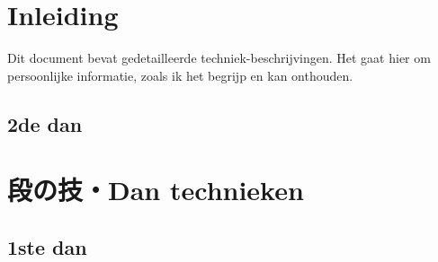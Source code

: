 \documentclass[a4paper, 12pt]{article}
\begin{document}

\begin{CJK*}{UTF8}{min}
\CJKtilde



\newpage
\setcounter{page}{1}
\tableofcontents

\newpage
\setcounter{page}{1}

\section{Inleiding}
\noindent Dit document bevat gedetailleerde techniek-beschrijvingen. Het gaat hier om persoonlijke informatie, zoals ik het begrijp en kan onthouden.

\subsection{2de dan}
\newpage
\section{段の技・Dan technieken}
\subsection{1ste dan}


%
%
%
%
%
%
%
%
\end{CJK*}
\end{document}
